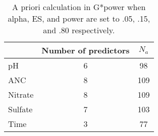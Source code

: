 \begin{table}[htbp]
		\caption[A priori results]{A priori calculation in G*power when alpha, ES, and power are set to .05, .15, and .80 respectively.}
		\begin{center}
		\begin{tabular}{lcc}
		\hline\noalign{\smallskip}
		 & \multicolumn{1}{l}{Number of predictors} & $N_a$ \\  \hline\noalign{\smallskip}
		pH & 6 & 98 \\ 
		ANC & 8 & 109 \\ 
		Nitrate & 8 & 109 \\ 
		Sulfate & 7 & 103 \\ 
		Time & 3 & 77 \\  \hline
		\end{tabular}
		\end{center}
		\label{tab:APN}
		\end{table}